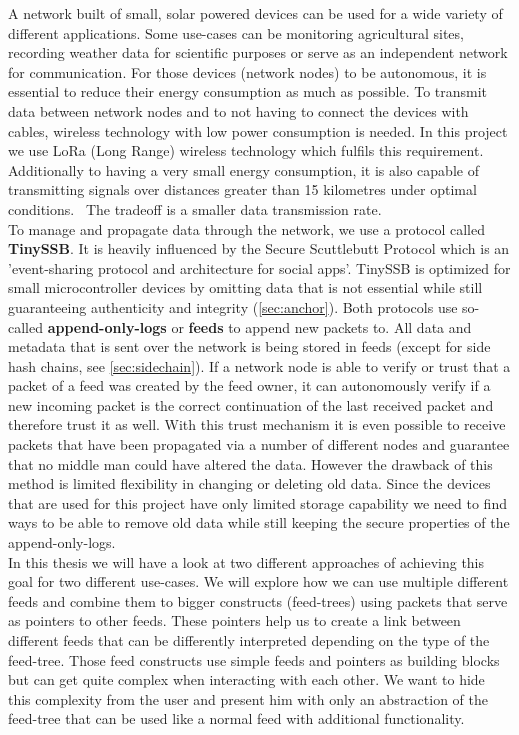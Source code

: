 A network built of small, solar powered devices can be used for a wide variety of different applications. Some use-cases can be monitoring agricultural sites, recording weather data for scientific purposes or serve as an independent network for communication. For those devices (network nodes) to be autonomous, it is essential to reduce their energy consumption as much as possible. To transmit data between network nodes and to not having to connect the devices with cables, wireless technology with low power consumption is needed. In this project we use LoRa (Long Range) wireless technology which fulfils this requirement. Additionally to having a very small energy consumption, it is also capable of transmitting signals over distances greater than 15 kilometres under optimal conditions.~\cite{10.1007/978-3-030-01168-0_11} The tradeoff is a smaller data transmission rate. \\
To manage and propagate data through the network, we use a protocol called \textbf{TinySSB}. It is heavily influenced by the Secure Scuttlebutt Protocol which is an 'event-sharing protocol and architecture for social apps'. \cite{10.1145/3357150.3357396} TinySSB is optimized for small microcontroller devices by omitting data that is not essential while still guaranteeing authenticity and integrity (\cref{sec:anchor}). Both protocols use so-called \textbf{append-only-logs} or \textbf{feeds} to append new packets to. All data and metadata that is sent over the network is being stored in feeds (except for side hash chains, see \cref{sec:sidechain}). If a network node is able to verify or trust that a packet of a feed was created by the feed owner, it can autonomously verify if a new incoming packet is the correct continuation of the last received packet and therefore trust it as well. With this trust mechanism it is even possible to receive packets that have been propagated via a number of different nodes and guarantee that no middle man could have altered the data. However the drawback of this method is limited flexibility in changing or deleting old data. Since the devices that are used for this project have only limited storage capability we need to find ways to be able to remove old data while still keeping the secure properties of the append-only-logs. \\
In this thesis we will have a look at two different approaches of achieving this goal for two different use-cases. We will explore how we can use multiple different feeds and combine them to bigger constructs (feed-trees) using packets that serve as pointers to other feeds. These pointers help us to create a link between different feeds that can be differently interpreted depending on the type of the feed-tree. Those feed constructs use simple feeds and pointers as building blocks but can get quite complex when interacting with each other. We want to hide this complexity from the user and present him with only an abstraction of the feed-tree that can be used like a normal feed with additional functionality. \\
